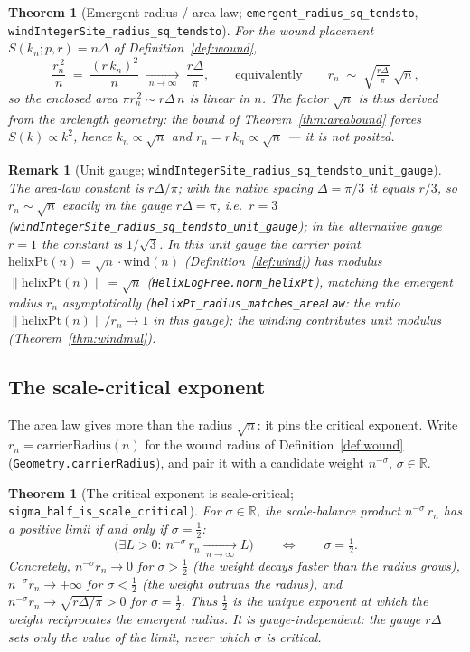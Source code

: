\documentclass[11pt]{article}
\newtheorem{theorem}[definition]{Theorem}
\newtheorem{remark}[definition]{Remark}
\newcommand{\R}{\mathbb{R}}
\newcommand{\code}[1]{\texttt{#1}}
\begin{document}
\begin{theorem}[Emergent radius / area law; \code{emergent\_radius\_sq\_tendsto}, \code{windIntegerSite\_radius\_sq\_tendsto}]\label{thm:arealaw}
For the wound placement $S(k_n;p,r)=n\Delta$ of Definition~\ref{def:wound},
\[
  \frac{r_n^{\,2}}{n}\;=\;\frac{(r\,k_n)^2}{n}\;\xrightarrow[\;n\to\infty\;]{}\;\frac{r\Delta}{\pi},
  \qquad\text{equivalently}\qquad r_n\;\sim\;\sqrt{\tfrac{r\Delta}{\pi}}\;\sqrt n,
\]
so the enclosed area $\pi r_n^{\,2}\sim r\Delta\,n$ is linear in $n$. The factor $\sqrt n$ is thus
\emph{derived from the arclength geometry}: the bound of Theorem~\ref{thm:areabound} forces
$S(k)\propto k^2$, hence $k_n\propto\sqrt n$ and $r_n=r\,k_n\propto\sqrt n$ --- it is not posited.
\end{theorem}

\begin{remark}[Unit gauge; \code{windIntegerSite\_radius\_sq\_tendsto\_unit\_gauge}]\label{rem:gauge}
The area-law constant is $r\Delta/\pi$; with the native spacing $\Delta=\pi/3$ it equals $r/3$, so
$r_n\sim\sqrt n$ \emph{exactly} in the gauge $r\Delta=\pi$, i.e.\ $r=3$
(\code{windIntegerSite\_radius\_sq\_tendsto\_unit\_gauge}); in the alternative gauge $r=1$ the
constant is $1/\sqrt3$. In this unit gauge the carrier point
$\mathrm{helixPt}(n)=\sqrt n\cdot\mathrm{wind}(n)$ (Definition~\ref{def:wind}) has modulus
$\|\mathrm{helixPt}(n)\|=\sqrt n$ (\code{HelixLogFree.norm\_helixPt}), matching the emergent radius
$r_n$ asymptotically (\code{helixPt\_radius\_matches\_areaLaw}: the ratio
$\|\mathrm{helixPt}(n)\|/r_n\to 1$ in this gauge); the winding contributes unit modulus
(Theorem~\ref{thm:windmul}).
\end{remark}

\subsection{The scale-critical exponent}\label{sub:scalecrit}

The area law gives more than the radius $\sqrt n$: it pins the critical exponent. Write
$r_n=\mathrm{carrierRadius}(n)$ for the wound radius of Definition~\ref{def:wound}
(\code{Geometry.carrierRadius}), and pair it with a candidate weight $n^{-\sigma}$, $\sigma\in\R$.

\begin{theorem}[The critical exponent is scale-critical; \code{sigma\_half\_is\_scale\_critical}]\label{thm:scalecrit}
For $\sigma\in\R$, the scale-balance product $n^{-\sigma}\,r_n$ has a positive limit if and only if
$\sigma=\tfrac12$:
\[
  \bigl(\exists L>0:\ n^{-\sigma}\,r_n\xrightarrow[\;n\to\infty\;]{}L\bigr)
  \qquad\Longleftrightarrow\qquad \sigma=\tfrac12 .
\]
Concretely, $n^{-\sigma}r_n\to 0$ for $\sigma>\tfrac12$ (the weight decays faster than the radius
grows), $n^{-\sigma}r_n\to+\infty$ for $\sigma<\tfrac12$ (the weight outruns the radius), and
$n^{-\sigma}r_n\to\sqrt{r\Delta/\pi}>0$ for $\sigma=\tfrac12$. Thus $\tfrac12$ is the unique exponent at
which the weight reciprocates the emergent radius. It is \emph{gauge-independent}: the gauge $r\Delta$
sets only the value of the limit, never which $\sigma$ is critical.
\end{theorem}
\end{document}
